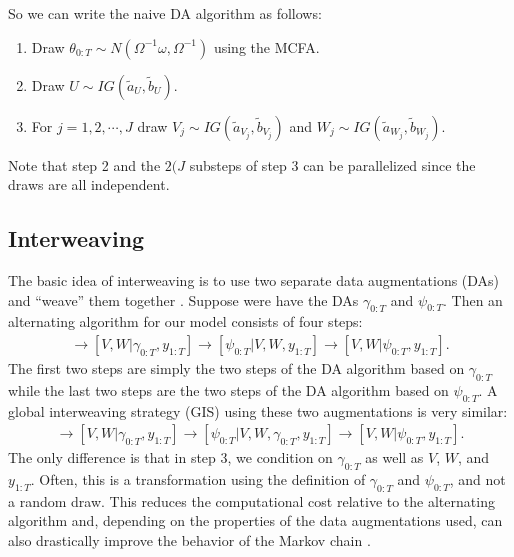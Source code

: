 \documentclass[graybox]{svmult}
\begin{document}
So we can write the naive DA algorithm as follows:
\begin{enumerate}
\item Draw $\theta_{0:T}\sim N(\Omega^{-1}\omega, \Omega^{-1})$ using the MCFA.
\item Draw $U\sim IG(\tilde{a}_U,\tilde{b}_U)$. 
\item For $j=1,2,\cdots,J$ draw $V_j\sim IG(\tilde{a}_{V_j},\tilde{b}_{V_j})$ and $W_j\sim IG(\tilde{a}_{W_j},\tilde{b}_{W_j})$.
\end{enumerate}
Note that step 2 and the $2(J$ substeps of step 3 can be parallelized since the draws are all independent.

\subsection{Interweaving}\label{sec:inter}
The basic idea of interweaving is to use two separate data augmentations (DAs) and ``weave'' them together \citep{yu2011center}. Suppose were have the DAs $\gamma_{0:T}$ and $\psi_{0:T}$. Then an alternating algorithm for our model consists of four steps:
\begin{align*}
[\gamma_{0:T}|V,W,y_{1:T}] \to [V,W|\gamma_{0:T},y_{1:T}] \to [\psi_{0:T}|V,W,y_{1:T}] \to [V,W|\psi_{0:T},y_{1:T}].
\end{align*}
The first two steps are simply the two steps of the DA algorithm based on $\gamma_{0:T}$ while the last two steps are the two steps of the DA algorithm based on $\psi_{0:T}$. A global interweaving strategy (GIS) using these two augmentations is very similar:
\begin{align*}
[\gamma_{0:T}|V,W,y_{1:T}] \to [V,W|\gamma_{0:T},y_{1:T}] \to [\psi_{0:T}|V,W,\gamma_{0:T},y_{1:T}] \to [V,W|\psi_{0:T},y_{1:T}].
\end{align*}
The only difference is that in step 3, we condition on $\gamma_{0:T}$ as well as $V$, $W$, and $y_{1:T}$. Often, this is a transformation using the definition of $\gamma_{0:T}$ and $\psi_{0:T}$, and not a random draw. This reduces the computational cost relative to the alternating algorithm and, depending on the properties of the data augmentations used, can also drastically improve the behavior of the Markov chain \citep{yu2011center}.
\end{document}
